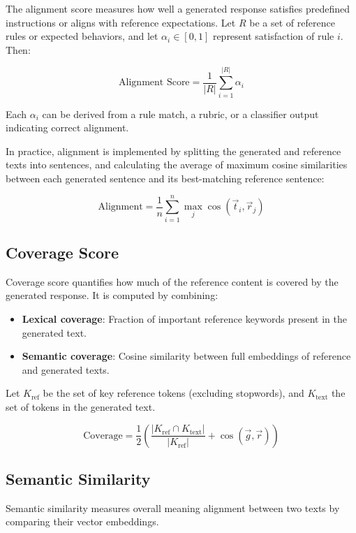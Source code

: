 \documentclass[12pt]{article}
\begin{document}
The alignment score measures how well a generated response satisfies predefined instructions or aligns with reference expectations. Let \( R \) be a set of reference rules or expected behaviors, and let \( \alpha_i \in [0, 1] \) represent satisfaction of rule \( i \). Then:

\[
\text{Alignment Score} = \frac{1}{|R|} \sum_{i=1}^{|R|} \alpha_i
\]

Each \( \alpha_i \) can be derived from a rule match, a rubric, or a classifier output indicating correct alignment.

In practice, alignment is implemented by splitting the generated and reference texts into sentences, and calculating the average of maximum cosine similarities between each generated sentence and its best-matching reference sentence:

\[
\text{Alignment} = \frac{1}{n} \sum_{i=1}^{n} \max_{j} \cos(\vec{t}_i, \vec{r}_j)
\]

\subsection*{Coverage Score}

Coverage score quantifies how much of the reference content is covered by the generated response. It is computed by combining:

\begin{itemize}
    \item \textbf{Lexical coverage}: Fraction of important reference keywords present in the generated text.
    \item \textbf{Semantic coverage}: Cosine similarity between full embeddings of reference and generated texts.
\end{itemize}

Let \( K_{\text{ref}} \) be the set of key reference tokens (excluding stopwords), and \( K_{\text{text}} \) the set of tokens in the generated text.

\[
\text{Coverage} = \frac{1}{2} \left( \frac{|K_{\text{ref}} \cap K_{\text{text}}|}{|K_{\text{ref}}|} + \cos(\vec{g}, \vec{r}) \right)
\]

\subsection*{Semantic Similarity}

Semantic similarity measures overall meaning alignment between two texts by comparing their vector embeddings.
\end{document}
